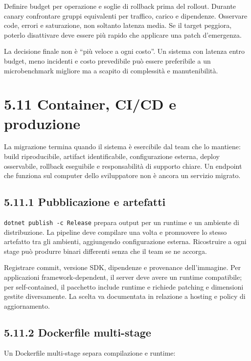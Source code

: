 \documentclass[
  italian,
  10pt,
]{book}
\begin{document}
Definire budget per operazione e soglie di rollback prima del rollout.
Durante canary confrontare gruppi equivalenti per traffico, carico e
dipendenze. Osservare code, errori e saturazione, non soltanto latenza
media. Se il target peggiora, poterlo disattivare deve essere più rapido
che applicare una patch d'emergenza.

La decisione finale non è ``più veloce a ogni costo''. Un sistema con
latenza entro budget, meno incidenti e costo prevedibile può essere
preferibile a un microbenchmark migliore ma a scapito di complessità e
manutenibilità.

\section{5.11 Container, CI/CD e
produzione}\label{container-cicd-e-produzione}

La migrazione termina quando il sistema è esercibile dal team che lo
mantiene: build riproducibile, artifact identificabile, configurazione
esterna, deploy osservabile, rollback eseguibile e responsabilità di
supporto chiare. Un endpoint che funziona sul computer dello
sviluppatore non è ancora un servizio migrato.

\subsection{5.11.1 Pubblicazione e
artefatti}\label{pubblicazione-e-artefatti}

\texttt{dotnet\ publish\ -c\ Release} prepara output per un runtime e un
ambiente di distribuzione. La pipeline deve compilare una volta e
promuovere lo stesso artefatto tra gli ambienti, aggiungendo
configurazione esterna. Ricostruire a ogni stage può produrre binari
differenti senza che il team se ne accorga.

Registrare commit, versione SDK, dipendenze e provenance dell'immagine.
Per applicazioni framework-dependent, il server deve avere un runtime
compatibile; per self-contained, il pacchetto include runtime e richiede
patching e dimensioni gestite diversamente. La scelta va documentata in
relazione a hosting e policy di aggiornamento.

\subsection{5.11.2 Dockerfile multi-stage}\label{dockerfile-multi-stage}

Un Dockerfile multi-stage separa compilazione e runtime:
\end{document}
